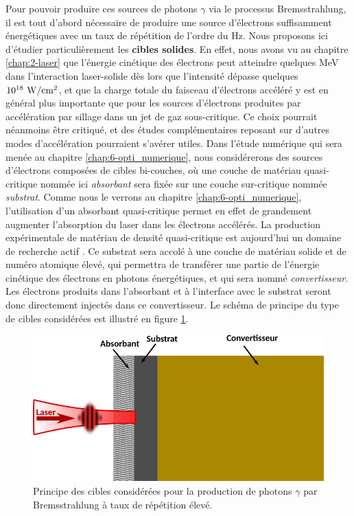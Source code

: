 \begin{refsection}
Pour pouvoir produire ces sources de photons $\gamma$ via le processus Bremsstrahlung, il est tout d'abord nécessaire de produire une source d'électrons suffisamment énergétiques avec un taux de répétition de l'ordre du Hz. 
Nous proposons ici d'étudier particulièrement les \textbf{cibles solides}. En effet, nous avons vu au chapitre \ref{chap:2-laser} que l'énergie cinétique des électrons peut atteindre quelques MeV dans l'interaction laser-solide dès lors que l'intensité dépasse quelques $10^{18} ~ \rm W/cm^2$, et que la charge totale du faisceau d'électrons accéléré y est en général plus importante que pour les sources d'électrons produites par accélération par sillage dans un jet de gaz sous-critique. Ce choix pourrait néanmoins être critiqué, et des études complémentaires reposant sur d'autres modes d'accélération pourraient s'avérer utiles.
Dans l'étude numérique qui sera menée au chapitre \ref{chap:6-opti_numerique}, nous considérerons des sources d'électrons composées de cibles bi-couches, où une couche de matériau quasi-critique nommée ici \textit{absorbant} sera fixée sur une couche sur-critique nommée \textit{substrat}. Comme nous le verrons au chapitre \ref{chap:6-opti_numerique}, l'utilisation d'un absorbant quasi-critique permet en effet de grandement augmenter l'absorption du laser dans les électrons accélérés. La production expérimentale de matériau de densité quasi-critique est aujourd'hui un domaine de recherche actif \parencite{prencipe_2017, passoni_2020, carrier-vallieres_2017}.
Ce substrat sera accolé à une couche de matériau solide et de numéro atomique élevé, qui permettra de transférer une partie de l'énergie cinétique des électrons en photons énergétiques, et qui sera nommé \textit{convertisseur}. Les électrons produits dans l'absorbant et à l'interface avec le substrat seront donc directement injectés dans ce convertisseur.
Le schéma de principe du type de cibles considérées est illustré en figure \ref{fig:3-principe_cibles}.

\begin{figure}[t]
	\centering
	\includegraphics[width=0.7\linewidth]{3-experience/principe_cible.png}
	\caption{Principe des cibles considérées pour la production de photons $\gamma$ par Bremsstrahlung à taux de répétition élevé.}
	\label{fig:3-principe_cibles}
\end{figure}


\end{refsection}
